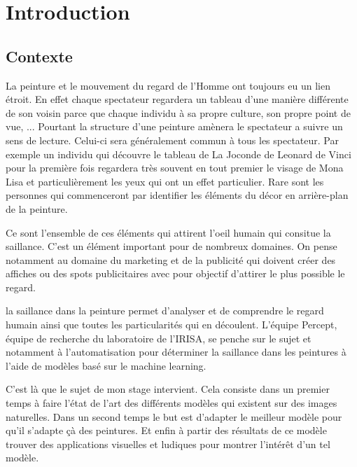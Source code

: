 \chapter{Introduction}


\section{Contexte}

\par
La peinture et le mouvement du regard de l'Homme ont toujours eu un lien étroit. En effet chaque spectateur regardera un tableau d'une manière différente de son voisin parce que chaque individu à sa propre culture, son propre point de vue, ... Pourtant la structure d'une peinture amènera le spectateur a suivre un sens de lecture. Celui-ci sera généralement commun à tous les spectateur. Par exemple un individu qui découvre le tableau de La Joconde de Leonard de Vinci pour la première fois regardera très souvent en tout premier le visage de Mona Lisa et particulièrement les yeux qui ont un effet particulier. Rare sont les personnes qui commenceront par identifier les éléments du décor en arrière-plan de la peinture.

\par
Ce sont l'ensemble de ces éléments qui attirent l'oeil humain qui consitue la saillance. C'est un élément important pour de nombreux domaines. On pense notamment au domaine du marketing et de la publicité qui doivent créer des affiches ou des spots publicitaires avec pour objectif d'attirer le plus possible le regard.

\par
la saillance dans la peinture permet d'analyser et de comprendre le regard humain ainsi que toutes les particularités qui en découlent. L'équipe Percept, équipe de recherche du laboratoire de l'IRISA, se penche sur le sujet et notamment à l'automatisation pour déterminer la saillance dans les peintures à l'aide de modèles basé sur le machine learning.

\par
C'est là que le sujet de mon stage intervient. Cela consiste dans un premier temps à faire l'état de l'art des différents modèles qui existent sur des images naturelles. Dans un second temps le but est d'adapter le meilleur modèle pour qu'il s'adapte çà des peintures. Et enfin à partir des résultats de ce modèle trouver des applications visuelles et ludiques pour montrer l'intérêt d'un tel modèle.

